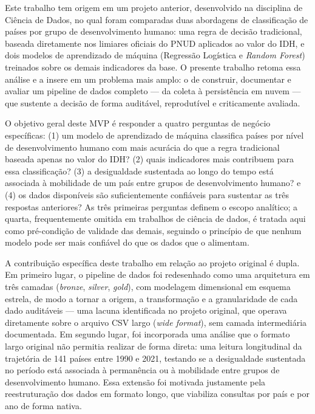 \documentclass[11pt,a4paper]{article}
\begin{document}
Este trabalho tem origem em um projeto anterior, desenvolvido na disciplina de Ciência de Dados, no qual foram comparadas duas abordagens de classificação de países por grupo de desenvolvimento humano: uma regra de decisão tradicional, baseada diretamente nos limiares oficiais do PNUD aplicados ao valor do IDH, e dois modelos de aprendizado de máquina (Regressão Logística e \textit{Random Forest}) treinados sobre os demais indicadores da base. O presente trabalho retoma essa análise e a insere em um problema mais amplo: o de construir, documentar e avaliar um pipeline de dados completo --- da coleta à persistência em nuvem --- que sustente a decisão de forma auditável, reprodutível e criticamente avaliada.

O objetivo geral deste MVP é responder a quatro perguntas de negócio específicas: (1) um modelo de aprendizado de máquina classifica países por nível de desenvolvimento humano com mais acurácia do que a regra tradicional baseada apenas no valor do IDH? (2) quais indicadores mais contribuem para essa classificação? (3) a desigualdade sustentada ao longo do tempo está associada à mobilidade de um país entre grupos de desenvolvimento humano? e (4) os dados disponíveis são suficientemente confiáveis para sustentar as três respostas anteriores? As três primeiras perguntas definem o escopo analítico; a quarta, frequentemente omitida em trabalhos de ciência de dados, é tratada aqui como pré-condição de validade das demais, seguindo o princípio de que nenhum modelo pode ser mais confiável do que os dados que o alimentam.

A contribuição específica deste trabalho em relação ao projeto original é dupla. Em primeiro lugar, o pipeline de dados foi redesenhado como uma arquitetura em três camadas (\textit{bronze}, \textit{silver}, \textit{gold}), com modelagem dimensional em esquema estrela, de modo a tornar a origem, a transformação e a granularidade de cada dado auditáveis --- uma lacuna identificada no projeto original, que operava diretamente sobre o arquivo CSV largo (\textit{wide format}), sem camada intermediária documentada. Em segundo lugar, foi incorporada uma análise que o formato largo original não permitia realizar de forma direta: uma leitura longitudinal da trajetória de 141 países entre 1990 e 2021, testando se a desigualdade sustentada no período está associada à permanência ou à mobilidade entre grupos de desenvolvimento humano. Essa extensão foi motivada justamente pela reestruturação dos dados em formato longo, que viabiliza consultas por país e por ano de forma nativa.
\end{document}
